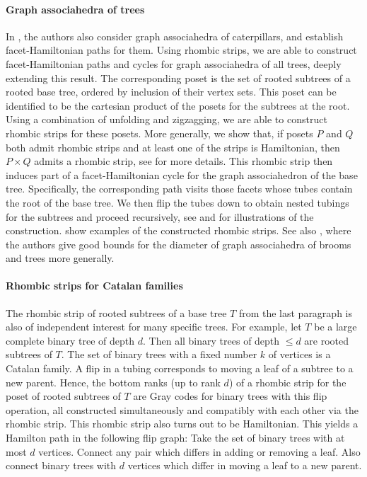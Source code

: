 \documentclass[fontsize=11pt,a4paper,DIV=12]{scrartcl}
\begin{document}
\paragraph{Graph associahedra of trees}
In \cite{facethamiltonicity}, the authors also consider graph associahedra of caterpillars, and establish facet-Hamiltonian paths for them. Using rhombic strips, we are able to construct facet-Hamiltonian paths and cycles for graph associahedra of all trees, deeply extending this result. The corresponding poset is the set of rooted subtrees of a rooted base tree, ordered by inclusion of their vertex sets. This poset can be identified to be the cartesian product of the posets for the subtrees at the root. Using a combination of unfolding and zigzagging, we are able to construct rhombic strips for these posets. More generally, we show that, if posets $P$ and $Q$ both admit rhombic strips and at least one of the strips is Hamiltonian, then $P\times Q$ admits a rhombic strip, see  for more details. This rhombic strip then induces part of a facet-Hamiltonian cycle for the graph associahedron of the base tree. Specifically, the corresponding path visits those facets whose tubes contain the root of the base tree. We then flip the tubes down to obtain nested tubings for the subtrees and proceed recursively, see  and  for illustrations of the construction.  show examples of the constructed rhombic strips. See also \cite{Broom_associahedra_diameter, Tree_associahedra_diameter}, where the authors give good bounds for the diameter of graph associahedra of brooms and trees more generally.

\paragraph{Rhombic strips for Catalan families}
The rhombic strip of rooted subtrees of a base tree $T$ from the last paragraph is also of independent interest for many specific trees. For example, let $T$ be a large complete binary tree of depth $d$. Then all binary trees of depth $\le d$ are rooted subtrees of $T$. The set of binary trees with a fixed number $k$ of vertices is a Catalan family. A flip in a tubing corresponds to moving a leaf of a subtree to a new parent. Hence, the bottom ranks (up to rank $d$) of a rhombic strip for the poset of rooted subtrees of $T$ are Gray codes for binary trees with this flip operation, all constructed simultaneously and compatibly with each other via the rhombic strip. This rhombic strip also turns out to be Hamiltonian. This yields a Hamilton path in the following flip graph: Take the set of binary trees with at most $d$ vertices. Connect any pair which differs in adding or removing a leaf. Also connect binary trees with $d$ vertices which differ in moving a leaf to a new parent.
\end{document}
